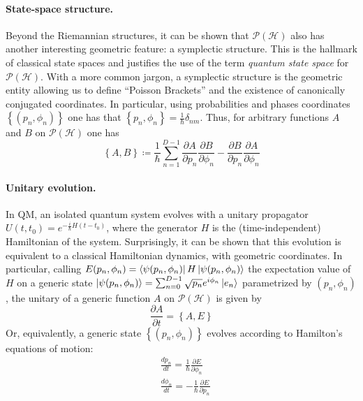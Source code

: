 \documentclass[draft,nofootinbib,pre,twocolumn,showpacs,showkeys,preprintnumbers,floatfix]{revtex4-1}
\newcommand{\1}{\mathbbm{1}}
\newcommand{\PH}{\mathcal{P}(\mathcal{H})}
\begin{document}
\paragraph*{State-space structure.} Beyond the Riemannian structures, it can 
be shown that $\PH$ also has another interesting geometric feature: a symplectic structure.
This is the hallmark of classical state spaces and justifies the use of the term 
\emph{quantum state space} for $\PH$. With a more common jargon, a symplectic
structure is the geometric entity allowing us to define ``Poisson Brackets''
and the existence of canonically conjugated coordinates. In particular, using 
probabilities and phases coordinates $\left\{ (p_n,\phi_n)\right\}$
one has that $\left\{ p_n , \phi_n \right\} = \frac{1}{\hbar}\delta_{nm}$. Thus,
for arbitrary functions $A$ and $B$ on $\PH$ one has
\begin{equation}
\left\{ A, B\right\} \coloneqq \frac{1}{\hbar}\sum_{n=1}^{D-1} \frac{\partial A}{\partial p_n} \frac{\partial B}{\partial \phi_n} - \frac{\partial B}{\partial p_n} \frac{\partial A}{\partial \phi_n}
\end{equation}


\paragraph*{Unitary evolution.} In QM, an isolated quantum system evolves
with a unitary propagator $U(t,t_0) = e^{-\frac{i}{\hbar}H (t-t_0)}$, where the
generator $H$ is the (time-independent) Hamiltonian of the system. Surprisingly, 
it can be shown \cite{QUA} that this evolution is equivalent to a classical Hamiltonian 
dynamics, with geometric coordinates. In particular, calling $E(p_n, \phi_n) = \bra{\psi(p_n,\phi_n)}H \ket{\psi(p_n,\phi_n)}$
the expectation value of $H$ on a generic state $\ket{\psi(p_n,\phi_n)} = \sum_{n=0}^{D-1}\sqrt{p_n}e^{i\phi_n}\ket{e_n}$
parametrized by $(p_n,\phi_n)$, the unitary of a generic function $A$
on $\PH$ is given by 
\begin{equation}
\frac{\partial A}{\partial t} = \left\{ A,E\right\}
\end{equation}
Or, equivalently, a generic state $\left\{(p_n,\phi_n)\right\}$
evolves according to Hamilton's equations of motion:
\begin{subequations}\label{eq:HAM_EOM}
\begin{align}
&\frac{dp_n}{dt} = \frac{1}{\hbar}\frac{\partial E}{\partial \phi_n} \\
&\frac{d\phi_n}{dt} = -\frac{1}{\hbar}\frac{\partial E}{\partial p_n} 
\end{align}
\end{subequations}
\end{document}
